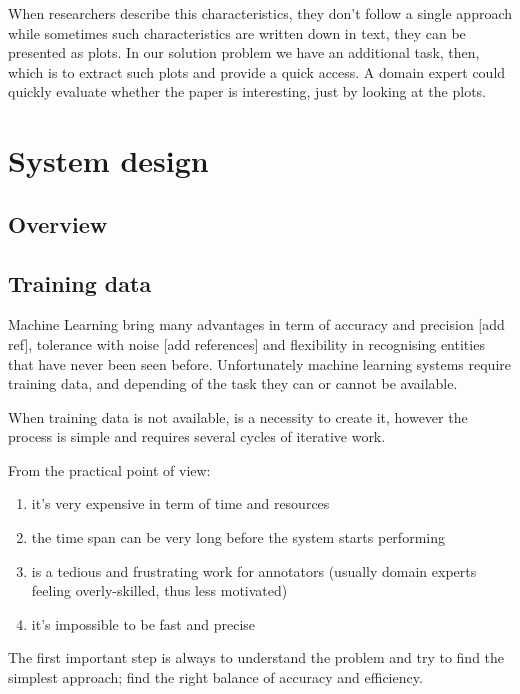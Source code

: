 \documentclass{article}
\begin{document}
When researchers describe this characteristics, they don't follow a single approach while sometimes such characteristics are written down in text, they can be presented as plots. 
In our solution problem we have an additional task, then, which is to extract such plots and provide a quick access. A domain expert could quickly evaluate whether the paper is interesting, just by looking at the plots. 

\section{System design}

\subsection{Overview}
\label{sec:overview}

\subsection{Training data}

Machine Learning bring many advantages in term of accuracy and precision [add ref], tolerance with noise [add references] and flexibility in recognising entities that have never been seen before. 
Unfortunately machine learning systems require training data, and depending of the task they can or cannot be available.

When training data is not available, is a necessity to create it, however the process is simple and requires several cycles of iterative work.

From the practical point of view:  
\begin{enumerate}
    \item it's very expensive in term of time and resources
    \item the time span can be very long before the system starts performing
    \item is a tedious and frustrating work for annotators (usually domain experts feeling overly-skilled, thus less motivated)
    \item it's impossible to be fast and precise 
\end{enumerate}
    
The first important step is always to understand the problem and try to find the simplest approach; find the right balance of accuracy and efficiency. 
\end{document}
